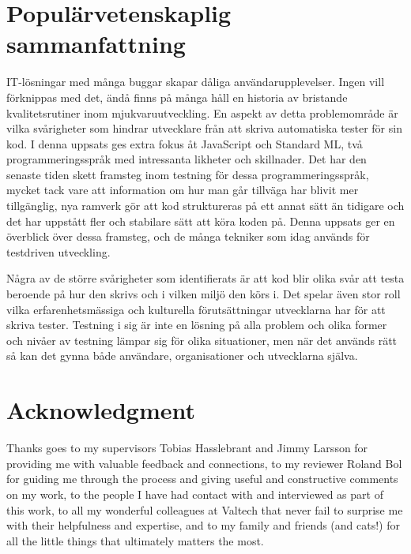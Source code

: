 \newpage
\null
\newpage

\section*{Populärvetenskaplig sammanfattning}

IT-lösningar med många buggar skapar dåliga användarupplevelser. Ingen vill förknippas med det, ändå finns på många håll en historia av bristande kvalitetsrutiner inom mjukvaruutveckling. En aspekt av detta problemområde är vilka svårigheter som hindrar utvecklare från att skriva automatiska tester för sin kod. I denna uppsats ges extra fokus åt JavaScript och Standard ML, två programmeringsspråk med intressanta likheter och skillnader. Det har den senaste tiden skett framsteg inom testning för dessa programmeringsspråk, mycket tack vare att information om hur man går tillväga har blivit mer tillgänglig, nya ramverk gör att kod struktureras på ett annat sätt än tidigare och det har uppstått fler och stabilare sätt att köra koden på. Denna uppsats ger en överblick över dessa framsteg, och de många tekniker som idag används för testdriven utveckling.

Några av de större svårigheter som identifierats är att kod blir olika svår att testa beroende på hur den skrivs och i vilken miljö den körs i. Det spelar även stor roll vilka erfarenhetsmässiga och kulturella förutsättningar utvecklarna har för att skriva tester. Testning i sig är inte en lösning på alla problem och olika former och nivåer av testning lämpar sig för olika situationer, men när det används rätt så kan det gynna både användare, organisationer och utvecklarna själva.

\newpage
\null
\newpage

\section*{Acknowledgment}

Thanks goes to my supervisors Tobias Hasslebrant and Jimmy Larsson for providing me with valuable feedback and connections, to my reviewer Roland Bol for guiding me through the process and giving useful and constructive comments on my work, to the people I have had contact with and interviewed as part of this work, to all my wonderful colleagues at Valtech that never fail to surprise me with their helpfulness and expertise, and to my family and friends (and cats!) for all the little things that ultimately matters the most.

\newpage
\null
\newpage

\tableofcontents

\newpage
\null
\newpage

